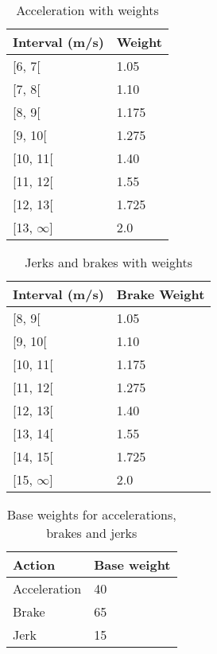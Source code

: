\begin{table}
    \centering
    \begin{tabular}{ll}
    \textbf{Interval (m/s)} & \textbf{Weight} \\ \hline
    {[}6, 7{[}              & 1.05             \\
    {[}7, 8{[}              & 1.10             \\
    {[}8, 9{[}              & 1.175             \\
    {[}9, 10{[}             & 1.275             \\
    {[}10, 11{[}            & 1.40            \\
    {[}11, 12{[}            & 1.55             \\
    {[}12, 13{[}            & 1.725             \\
    {[}13, $\infty${]}      & 2.0             \\ \hline
    \end{tabular}
    \caption{Acceleration with weights}
    \label{tab:accelerationvalues}
\end{table}

\begin{table}
    \centering
    \begin{tabular}{ll}
    \textbf{Interval (m/s)} & \textbf{Brake Weight} \\ \hline
    {[}8, 9{[}              & 1.05 			             \\
    {[}9, 10{[}             & 1.10			              \\
    {[}10, 11{[}            & 1.175   		           \\
    {[}11, 12{[}            & 1.275  		            \\
    {[}12, 13{[}            & 1.40   		          \\
    {[}13, 14{[}            & 1.55    		          \\
    {[}14, 15{[}            & 1.725  		            \\
    {[}15, $\infty${]}      & 2.0    	   	       \\ \hline
    \end{tabular}
    \caption{Jerks and brakes with weights}
    \label{tab:jerkbrakenvalues}
\end{table}

\begin{table}
    \centering
    \begin{tabular}{ll}
    \textbf{Action} & \textbf{Base weight} \\ \hline
    Acceleration    & 40                   \\
    Brake           & 65                   \\
    Jerk            & 15                 \\ \hline
    \end{tabular}
    \caption{Base weights for accelerations, brakes and jerks}
    \label{tab:basevalues}
\end{table}

